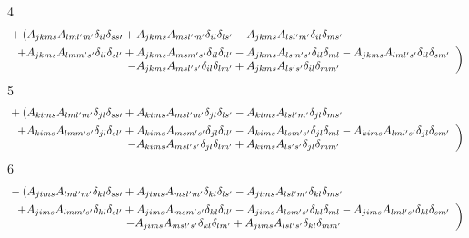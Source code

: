 \documentclass[aps,preprint]{revtex4}%
\begin{document}
4%
\begin{align}
&  +\left(  A_{jkms}A_{lml^{\prime}m^{\prime}}\delta_{il}\delta_{ss\prime
}+A_{jkms}A_{msl^{\prime}m^{\prime}}\delta_{il}\delta_{ls^{\prime}}%
-A_{jkms}A_{lsl^{\prime}m^{\prime}}\delta_{il}\delta_{ms^{\prime}}\right. \\
&  \left.
\begin{array}
[c]{c}%
+A_{jkms}A_{lmm^{\prime}s^{\prime}}\delta_{il}\delta_{sl^{\prime}}%
+A_{jkms}A_{msm^{\prime}s^{\prime}}\delta_{il}\delta_{ll^{\prime}}%
-A_{jkms}A_{lsm^{\prime}s^{\prime}}\delta_{il}\delta_{ml}-A_{jkms}%
A_{lml^{\prime}s^{\prime}}\delta_{il}\delta_{sm^{\prime}}\\
-A_{jkms}A_{msl^{\prime}s^{\prime}}\delta_{il}\delta_{lm^{\prime}}%
+A_{jkms}A_{ls^{\prime}s^{\prime}}\delta_{il}\delta_{mm^{\prime}}%
\end{array}
\right)
\end{align}
5%
\begin{align}
&  +\left(  A_{kims}A_{lml^{\prime}m^{\prime}}\delta_{jl}\delta_{ss\prime
}+A_{kims}A_{msl^{\prime}m^{\prime}}\delta_{jl}\delta_{ls^{\prime}}%
-A_{kims}A_{lsl^{\prime}m^{\prime}}\delta_{jl}\delta_{ms^{\prime}}\right. \\
&  \left.
\begin{array}
[c]{c}%
+A_{kims}A_{lmm^{\prime}s^{\prime}}\delta_{jl}\delta_{sl^{\prime}}%
+A_{kims}A_{msm^{\prime}s^{\prime}}\delta_{jl}\delta_{ll^{\prime}}%
-A_{kims}A_{lsm^{\prime}s^{\prime}}\delta_{jl}\delta_{ml}-A_{kims}%
A_{lml^{\prime}s^{\prime}}\delta_{jl}\delta_{sm^{\prime}}\\
-A_{kims}A_{msl^{\prime}s^{\prime}}\delta_{jl}\delta_{lm^{\prime}}%
+A_{kims}A_{ls^{\prime}s^{\prime}}\delta_{jl}\delta_{mm^{\prime}}%
\end{array}
\right)
\end{align}
6%
\begin{align}
&  -\left(  A_{jims}A_{lml^{\prime}m^{\prime}}\delta_{kl}\delta_{ss\prime
}+A_{jims}A_{msl^{\prime}m^{\prime}}\delta_{kl}\delta_{ls^{\prime}}%
-A_{jims}A_{lsl^{\prime}m^{\prime}}\delta_{kl}\delta_{ms^{\prime}}\right. \\
&  \left.
\begin{array}
[c]{c}%
+A_{jims}A_{lmm^{\prime}s^{\prime}}\delta_{kl}\delta_{sl^{\prime}}%
+A_{jims}A_{msm^{\prime}s^{\prime}}\delta_{kl}\delta_{ll^{\prime}}%
-A_{jims}A_{lsm^{\prime}s^{\prime}}\delta_{kl}\delta_{ml}-A_{jims}%
A_{lml^{\prime}s^{\prime}}\delta_{kl}\delta_{sm^{\prime}}\\
-A_{jims}A_{msl^{\prime}s^{\prime}}\delta_{kl}\delta_{lm^{\prime}}%
+A_{jims}A_{lsl^{\prime}s^{\prime}}\delta_{kl}\delta_{mm^{\prime}}%
\end{array}
\right)
\end{align}
\end{document}

